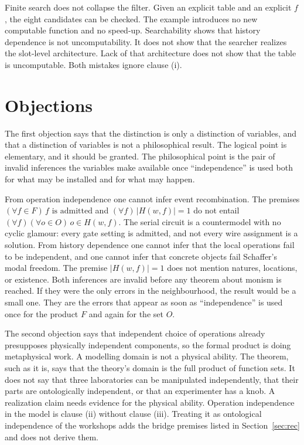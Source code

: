 \documentclass[12pt]{article}
\begin{document}
Finite search does not collapse the filter. Given an explicit table and an explicit \(f\), the eight candidates can be checked. The example introduces no new computable function and no speed-up. Searchability shows that history dependence is not uncomputability. It does not show that the searcher realizes the slot-level architecture. Lack of that architecture does not show that the table is uncomputable. Both mistakes ignore clause (i).

\section{Objections}
\label{sec:obj}

The first objection says that the distinction is only a distinction of variables, and that a distinction of variables is not a philosophical result. The logical point is elementary, and it should be granted. The philosophical point is the pair of invalid inferences the variables make available once ``independence'' is used both for what may be installed and for what may happen.

From operation independence one cannot infer event recombination. The premises \((\forall f\in F)\,f\text{ is admitted}\) and \((\forall f)\,|H(w,f)|=1\) do not entail \((\forall f)(\forall o\in O)\,o\in H(w,f)\). The serial circuit is a countermodel with no cyclic glamour: every gate setting is admitted, and not every wire assignment is a solution. From history dependence one cannot infer that the local operations fail to be independent, and one cannot infer that concrete objects fail Schaffer's modal freedom. The premise \(|H(w,f)|=1\) does not mention natures, locations, or existence. Both inferences are invalid before any theorem about monism is reached. If they were the only errors in the neighbourhood, the result would be a small one. They are the errors that appear as soon as ``independence'' is used once for the product \(F\) and again for the set \(O\).

The second objection says that independent choice of operations already presupposes physically independent components, so the formal product is doing metaphysical work. A modelling domain is not a physical ability. The theorem, such as it is, says that the theory's domain is the full product of function sets. It does not say that three laboratories can be manipulated independently, that their parts are ontologically independent, or that an experimenter has a knob. A realization claim needs evidence for the physical ability. Operation independence in the model is clause (ii) without clause (iii). Treating it as ontological independence of the workshops adds the bridge premises listed in Section~\ref{sec:rec} and does not derive them.
\end{document}
